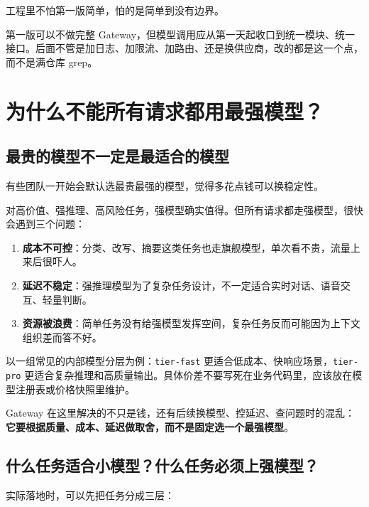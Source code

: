\documentclass[9pt,a4paper,twocolumn]{ctexart}
\begin{document}
工程里不怕第一版简单，怕的是简单到没有边界。



第一版可以不做完整 Gateway，但模型调用应从第一天起收口到统一模块、统一接口。后面不管是加日志、加限流、加路由、还是换供应商，改的都是这一个点，而不是满仓库 grep。



\section*{为什么不能所有请求都用最强模型？}


\subsection*{最贵的模型不一定是最适合的模型}


有些团队一开始会默认选最贵最强的模型，觉得多花点钱可以换稳定性。



对高价值、强推理、高风险任务，强模型确实值得。但所有请求都走强模型，很快会遇到三个问题：


\begin{enumerate}[itemsep=1pt, topsep=2pt]
  \item \textbf{成本不可控}：分类、改写、摘要这类任务也走旗舰模型，单次看不贵，流量上来后很吓人。
  \item \textbf{延迟不稳定}：强推理模型为了复杂任务设计，不一定适合实时对话、语音交互、轻量判断。
  \item \textbf{资源被浪费}：简单任务没有给强模型发挥空间，复杂任务反而可能因为上下文组织差而答不好。
\end{enumerate}


以一组常见的内部模型分层为例：\texttt{tier-fast} 更适合低成本、快响应场景，\texttt{tier-pro} 更适合复杂推理和高质量输出。具体价差不要写死在业务代码里，应该放在模型注册表或价格快照里维护。



Gateway 在这里解决的不只是钱，还有后续换模型、控延迟、查问题时的混乱：\textbf{它要根据质量、成本、延迟做取舍，而不是固定选一个最强模型}。



\subsection*{什么任务适合小模型？什么任务必须上强模型？}


实际落地时，可以先把任务分成三层：
\end{document}
